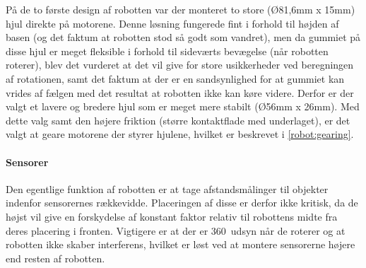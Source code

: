 På de to første design af robotten var der monteret to store (Ø81,6mm x 15mm) hjul direkte på motorene.
Denne løsning fungerede fint i forhold til højden af basen (og det faktum at robotten stod så godt som vandret), men da gummiet på disse hjul er meget fleksible i forhold til sideværts bevægelse (når robotten roterer), blev det vurderet at det vil give for store usikkerheder ved beregningen af rotationen, samt det faktum at der er en sandsynlighed for at gummiet kan vrides af fælgen med det resultat at robotten ikke kan køre videre.
Derfor er der valgt et lavere og bredere hjul som er meget mere stabilt (Ø56mm x 26mm).
Med dette valg samt den højere friktion (større kontaktflade med underlaget), er det valgt at geare motorene der styrer hjulene, hvilket er beskrevet i \cref{robot:gearing}.

\paragraph{Sensorer}
Den egentlige funktion af robotten er at tage afstandsmålinger til objekter indenfor sensorernes rækkevidde.
Placeringen af disse er derfor ikke kritisk, da de højst vil give en forskydelse af konstant faktor relativ til robottens midte fra deres placering i fronten.
Vigtigere er at der er 360\degree~udsyn når de roterer og at robotten ikke skaber interferens, hvilket er løst ved at montere sensorerne højere end resten af robotten. 





